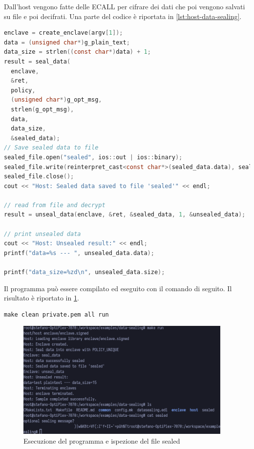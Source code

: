 \documentclass{article}
\begin{document}
Dall'host vengono fatte delle ECALL per cifrare dei dati che poi vengono salvati su file e poi decifrati. Una parte del codice è riportata in \cref{lst:host-data-sealing}. 

\begin{lstlisting}[language=c,caption=Codice host che effettua il sealing e unsealing dei dati,label=lst:host-data-sealing]
enclave = create_enclave(argv[1]);
data = (unsigned char*)g_plain_text;
data_size = strlen((const char*)data) + 1;
result = seal_data(
  enclave,
  &ret,
  policy,
  (unsigned char*)g_opt_msg,
  strlen(g_opt_msg),
  data,
  data_size,
  &sealed_data);
// Save sealed data to file
sealed_file.open("sealed", ios::out | ios::binary);
sealed_file.write(reinterpret_cast<const char*>(sealed_data.data), sealed_data.size);
sealed_file.close();
cout << "Host: Sealed data saved to file 'sealed'" << endl;

// read from file and decrypt
result = unseal_data(enclave, &ret, &sealed_data, 1, &unsealed_data);

// print unsealed data
cout << "Host: Unsealed result:" << endl;
printf("data=%s --- ", unsealed_data.data);

printf("data_size=%zd\n", unsealed_data.size);
\end{lstlisting}

Il programma può essere compilato ed eseguito con il comando di seguito. Il risultato è riportato in \cref{fig:oe-seal-data-example}.
\begin{verbatim}
make clean private.pem all run
\end{verbatim}

\begin{figure}
  \begin{center}
    \includegraphics[width=0.95\textwidth]{figures/ch3/oe-data-sealing-example.png}
  \end{center}
  \caption{Esecuzione del programma e ispezione del file sealed}\label{fig:oe-seal-data-example}
\end{figure}
\end{document}
